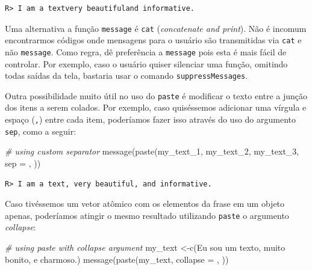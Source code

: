 \documentclass[
  11pt,
]{book}
\newenvironment{Shaded}{\begin{snugshade}}{\end{snugshade}}
\newcommand{\AttributeTok}[1]{\textcolor[rgb]{0.61,0.61,0.61}{#1}}
\newcommand{\CommentTok}[1]{\textcolor[rgb]{0.37,0.37,0.37}{\textit{#1}}}
\newcommand{\FunctionTok}[1]{\textcolor[rgb]{0,0,0}{#1}}
\newcommand{\NormalTok}[1]{#1}
\newcommand{\OtherTok}[1]{\textcolor[rgb]{0.37,0.37,0.37}{#1}}
\newcommand{\StringTok}[1]{\textcolor[rgb]{0.5,0.5,0.5}{#1}}
\newenvironment{rmdimportant}
{\begin{importantblock}

	} {\end{importantblock}}
\begin{document}
\begin{verbatim}
R> I am a textvery beautifuland informative.
\end{verbatim}

\begin{rmdimportant}
Uma alternativa a função \texttt{message} é \texttt{cat}
(\emph{concatenate and print}). Não é incomum encontrarmos códigos onde
mensagens para o usuário são transmitidas via \texttt{cat} e não
\texttt{message}. Como regra, dê preferência a \texttt{message} pois
esta é mais fácil de controlar. Por exemplo, caso o usuário quiser
silenciar uma função, omitindo todas saídas da tela, bastaria usar o
comando \texttt{suppressMessages}.
\end{rmdimportant}

Outra possibilidade muito útil no uso do \texttt{paste} é modificar o texto entre a junção dos itens a serem colados. Por exemplo, caso quiséssemos adicionar uma vírgula e espaço (\texttt{,}) entre cada item, poderíamos fazer isso através do uso do argumento \texttt{sep}, como a seguir:

\begin{Shaded}
\begin{Highlighting}[]
\CommentTok{\# using custom separator}
\FunctionTok{message}\NormalTok{(}\FunctionTok{paste}\NormalTok{(my\_text\_1, my\_text\_2, my\_text\_3, }\AttributeTok{sep =} \StringTok{\textquotesingle{}, \textquotesingle{}}\NormalTok{))}
\end{Highlighting}
\end{Shaded}

\begin{verbatim}
R> I am a text, very beautiful, and informative.
\end{verbatim}

Caso tivéssemos um vetor atômico com os elementos da frase em um objeto apenas, poderíamos atingir o mesmo resultado utilizando \texttt{paste} o argumento \emph{collapse}:

\begin{Shaded}
\begin{Highlighting}[]
\CommentTok{\# using paste with collapse argument}
\NormalTok{my\_text }\OtherTok{\textless{}{-}}\FunctionTok{c}\NormalTok{(}\StringTok{\textquotesingle{}Eu sou um texto\textquotesingle{}}\NormalTok{, }\StringTok{\textquotesingle{}muito bonito\textquotesingle{}}\NormalTok{, }\StringTok{\textquotesingle{}e charmoso.\textquotesingle{}}\NormalTok{)}
\FunctionTok{message}\NormalTok{(}\FunctionTok{paste}\NormalTok{(my\_text, }\AttributeTok{collapse =} \StringTok{\textquotesingle{}, \textquotesingle{}}\NormalTok{))}
\end{Highlighting}
\end{Shaded}
\end{document}

